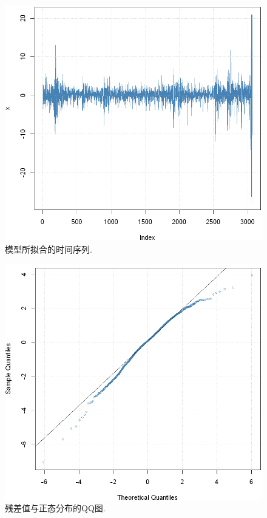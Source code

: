 \documentclass[11pt]{article}
\begin{document}
\begin{center}
    \hspace{30pt}\begin{minipage}{0.45\textwidth}
        \begin{figure}
            \centering
            \hspace{-25pt}\includegraphics[width=.9\textwidth]{output_44_0}
            \caption{模型所拟合的时间序列.\label{fig:15}}
        \end{figure}
    \end{minipage}
    \begin{minipage}{0.45\textwidth}
        \begin{figure}
            \centering
            \hspace{-25pt}\includegraphics[width=.9\textwidth]{output_45_0}
            \caption{残差值与正态分布的QQ图.\label{fig:16}}
        \end{figure}
    \end{minipage}
\end{center}
\end{document}
